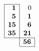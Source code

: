 \documentclass[11pt]{article}
\begin{document}
\TeXtoEPS
\setlength\arraycolsep{1pt}
\(
\begin{array}{|r|r}
\cline{1-1}
 \textbf{1} & 0\\
 \textbf{5} & \textbf{1}\\
\textbf{15} & \textbf{6}\\
\textbf{35} & \textbf{21}\\
\hline
\multicolumn{1}{r|}{} & \multicolumn{1}{r|}{\textbf{56}}\\
\cline{2-2}
\end{array}
\)
\endTeXtoEPS
\end{document}
